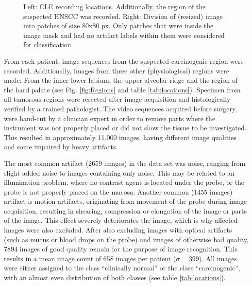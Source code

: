 \documentclass[fleqn,10pt]{wlscirep}
\begin{document}
\begin{figure}[!t]
\centering
{}
\caption{Left: CLE recording locations. Additionally, the region of the
  suspected HNSCC was recorded. Right: Division of (resized) image into patches of size 80x80 px. Only
  patches that were inside the image mask and had no artifact labels
  within them were considered for classification.}
\end{figure} 

From each patient, image sequences from the suspected carcinogenic region
were recorded. Additionally, images from three other (physiological) regions were made: From the inner lower
labium, the upper alveolar ridge and the region of the hard palate (see
Fig. \ref{fig:Regions} and table \ref{tab:locations}). Specimen from all tumorous regions were resected after image acquisition and
histologically verified by a trained pathologist. The video
sequences acquired before surgery, were hand-cut
by a clinician expert in order to remove parts where the instrument was not
properly placed or did not show the tissue to be investigated. This resulted in
approximately 11.000 images, having different image qualities and some
impaired by heavy artifacts.

The most common artifact (2659 images) in the data set was noise,
ranging from slight added noise to images containing only noise.
This may be related to an illumination problem, where no contrast
agent is located under the probe, or the probe is not properly placed
on the mucosa. 
Another common (1455 images) artifact is motion artifacts, originating from movement of the probe during image acquisition, resulting in shearing, compression or elongation of the image or parts of the image. This effect severely deteriorates the image, which is why affected images were also excluded. 
After also excluding images with optical artifacts (such as mucus or blood drops on the probe) and images of otherwise bad quality, 7894 %
 images of good quality remain for the purpose of image recognition. This results in a mean image count of 658 images per patient ($\sigma=399$). All images were either assigned to the class ``clinically normal'' or the class ``carcinogenic'', with an almost even distribution of both classes (see table \ref{tab:locations}).
\end{document}
